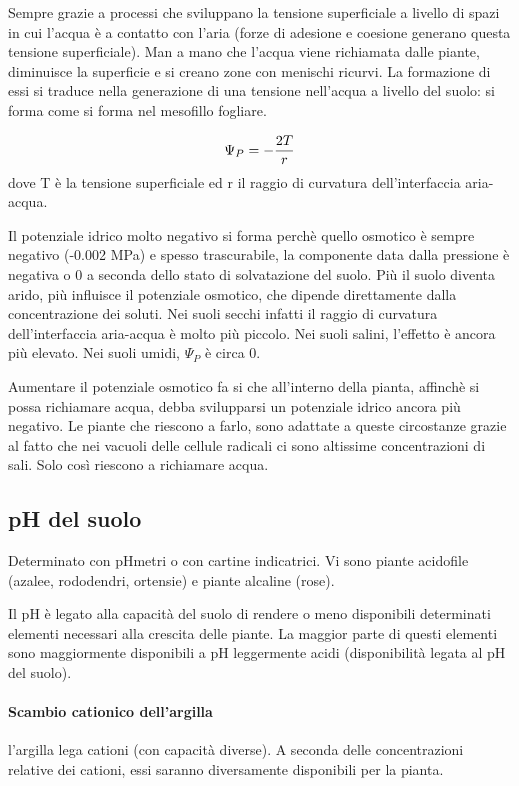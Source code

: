 \documentclass[a4paper,12pt]{book}
\begin{document}
Sempre grazie a processi che sviluppano la tensione superficiale a livello di spazi in cui l'acqua è a contatto con l'aria (forze di adesione e coesione generano questa tensione superficiale). Man a mano che l'acqua viene richiamata dalle piante, diminuisce la superficie e si creano zone con menischi ricurvi. La formazione di essi si traduce nella generazione di una tensione nell'acqua a livello del suolo: si forma come si forma nel mesofillo fogliare.

\begin{equation}
\centering
\Psi_{P}=- \frac{2T}{r}
\end{equation}
dove T è la tensione superficiale ed r il raggio di curvatura dell'interfaccia aria-acqua.


Il potenziale idrico molto negativo si forma perchè quello osmotico è sempre negativo (-0.002 MPa) e spesso trascurabile, la componente data dalla pressione è negativa o 0 a seconda dello stato di solvatazione del suolo. 
Più il suolo diventa arido, più influisce il potenziale osmotico, che dipende direttamente dalla concentrazione dei soluti. Nei suoli secchi infatti il raggio di curvatura dell'interfaccia aria-acqua è molto più piccolo.
Nei suoli salini, l'effetto è ancora più elevato. Nei suoli umidi, $\Psi_{P}$ è circa 0.

Aumentare il potenziale osmotico fa si che all'interno della pianta, affinchè si possa richiamare acqua, debba svilupparsi un potenziale idrico ancora più negativo. Le piante che riescono a farlo, sono adattate a queste circostanze grazie al fatto che nei vacuoli delle cellule radicali ci sono altissime concentrazioni di sali. Solo così riescono a richiamare acqua.

\subsection{pH del suolo}
Determinato con pHmetri o con cartine indicatrici.
Vi sono piante acidofile (azalee, rododendri, ortensie) e piante alcaline (rose).

Il pH è legato alla capacità del suolo di rendere o meno disponibili determinati elementi necessari alla crescita delle piante. La maggior parte di questi elementi sono maggiormente disponibili a pH leggermente acidi (disponibilità legata al pH del  suolo).

\paragraph{Scambio cationico dell'argilla} l'argilla lega cationi (con capacità diverse). A seconda delle concentrazioni relative dei cationi, essi saranno diversamente disponibili per la pianta.
\end{document}
